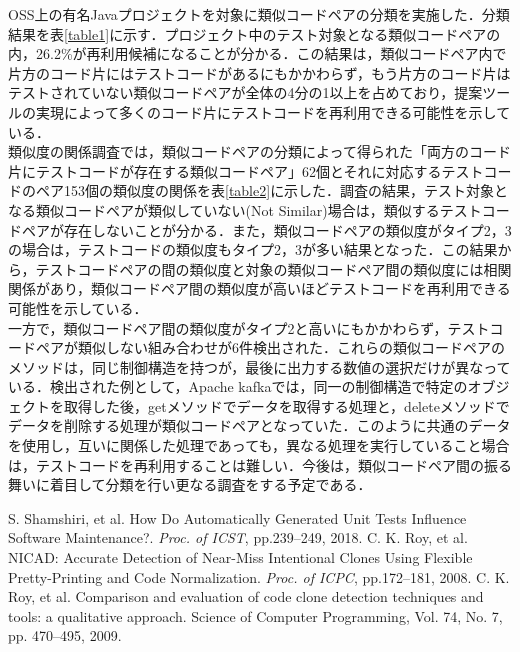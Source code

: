 \documentclass{fose2019}           %
\begin{document}
OSS上の有名Javaプロジェクトを対象に類似コードペアの分類を実施した．分類結果を表\ref{table1}に示す．プロジェクト中のテスト対象となる類似コードペアの内，26.2\%が再利用候補になることが分かる．この結果は，類似コードペア内で片方のコード片にはテストコードがあるにもかかわらず，もう片方のコード片はテストされていない類似コードペアが全体の4分の1以上を占めており，提案ツールの実現によって多くのコード片にテストコードを再利用できる可能性を示している．
\\\indent 類似度の関係調査では，類似コードペアの分類によって得られた「両方のコード片にテストコードが存在する類似コードペア」62個とそれに対応するテストコードのペア153個の類似度の関係を表\ref{table2}に示した．調査の結果，テスト対象となる類似コードペアが類似していない(Not Similar)場合は，類似するテストコードペアが存在しないことが分かる．また，類似コードペアの類似度がタイプ2，3の場合は，テストコードの類似度もタイプ2，3が多い結果となった．この結果から，テストコードペアの間の類似度と対象の類似コードペア間の類似度には相関関係があり，類似コードペア間の類似度が高いほどテストコードを再利用できる可能性を示している．
\\\indent 一方で，類似コードペア間の類似度がタイプ2と高いにもかかわらず，テストコードペアが類似しない組み合わせが6件検出された．これらの類似コードペアのメソッドは，同じ制御構造を持つが，最後に出力する数値の選択だけが異なっている．検出された例として，Apache kafkaでは，同一の制御構造で特定のオブジェクトを取得した後，getメソッドでデータを取得する処理と，deleteメソッドでデータを削除する処理が類似コードペアとなっていた．このように共通のデータを使用し，互いに関係した処理であっても，異なる処理を実行していること場合は，テストコードを再利用することは難しい．今後は，類似コードペア間の振る舞いに着目して分類を行い更なる調査をする予定である．


%

\begin{thebibliography}{2}
 S. Shamshiri, et al. How Do Automatically Generated Unit Tests Influence Software Maintenance?. {\it Proc. of ICST}, pp.239--249, 2018. 
 C. K. Roy, et al. NICAD: Accurate Detection of Near-Miss Intentional Clones Using Flexible Pretty-Printing and Code Normalization. {\it Proc. of ICPC}, pp.172--181, 2008.
 C. K. Roy, et al. Comparison and evaluation of code clone detection techniques and tools: a qualitative approach. Science of Computer Programming, Vol. 74, No. 7, pp. 470–495, 2009.
\end{thebibliography}
\end{document}

